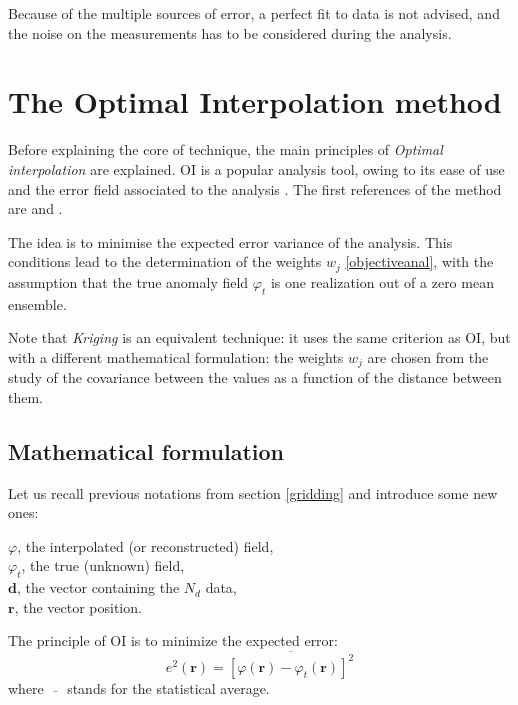 Because of the multiple sources of error, a perfect fit to data is not advised, and the noise on the measurements has to be considered during the analysis.

\section{The Optimal Interpolation method\label{sec:OImethod}}
 
Before explaining the core of \diva technique, the main principles of \textit{Optimal interpolation} \citep[OI,][]{STOR99,CHILES99} are explained. OI is a popular analysis tool, owing to its ease of use and the error field associated to the analysis \citep[e.g.,][]{SHEN98b,KAPLAN00}. The first references of the method are \citet{GANDIN65} and \citet{BRETHERTON76}.

The idea is to minimise the expected error variance of the analysis. This conditions lead to the determination of the weights $w_j$ \eqref{objectiveanal}, with the assumption that the true anomaly field $\varphi_t$ is one realization out of a zero mean ensemble. 

Note that \textit{Kriging} \citep{KRIGE51,MATHERON63} is an equivalent technique: it uses the same criterion as OI, but with a different mathematical formulation: the weights $w_{j}$ are chosen from the study of the covariance between the values as a function of the distance between them.

\subsection{Mathematical formulation}

Let us recall previous notations from section \ref{gridding} and introduce some new ones:

$\varphi$, the interpolated (or reconstructed) field,\\
$\varphi_{t}$, the true (unknown) field,\\
$\mathbf{d}$, the vector containing the $N_{d}$ data,\\
$\mathbf{r}$, the vector position.

The principle of OI is to minimize the expected error:
\begin{equation}
e^{2}(\mathbf{r}) = \overline{[\varphi(\mathbf{r})-\varphi_{t}(\mathbf{r})]^{2}}
\end{equation}
where $\bar{\quad}$ stands for the statistical average.

